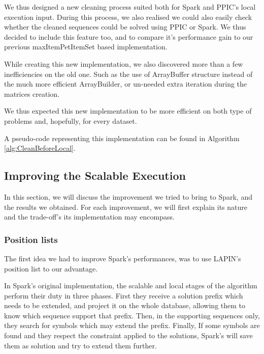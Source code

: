 \documentclass{eplmastersthesis}
\begin{document}
We thus designed a new cleaning process suited both for Spark and PPIC's local execution input. During this process, we also realised we could also easily check whether the cleaned sequences could be solved using PPIC or Spark. We thus decided to include this feature too, and to compare it's performance gain to our previous maxItemPetItemSet based implementation.

While creating this new implementation, we also discovered more than a few inefficiencies on the old one. Such as the use of ArrayBuffer structure instead of the much more efficient ArrayBuilder, or un-needed extra iteration during the matrices creation. \newline

We thus expected this new implementation to be more efficient on both type of problems and, hopefully, for every dataset.

A pseudo-code representing this implementation can be found in Algorithm \ref{alg:CleanBeforeLocal}.

\subsection{Improving the Scalable Execution}

In this section, we will discuss the improvement we tried to bring to Spark, and the results we obtained. For each improvement, we will first explain its nature and the trade-off's its implementation may encompass.

\subsubsection{Position lists}

The first idea we had to improve Spark's performances, was to use LAPIN's position list to our advantage. \newline

In Spark's original implementation, the scalable and local stages of the algorithm perform their duty in three phases. First they receive a solution prefix which needs to be extended, and project it on the whole database, allowing them to know which sequence support that prefix. Then, in the supporting sequences only, they search for symbols which may extend the prefix. Finally, If some symbols are found and they respect the constraint applied to the solutions, Spark's will save them as solution and try to extend them further. \newline
\end{document}
